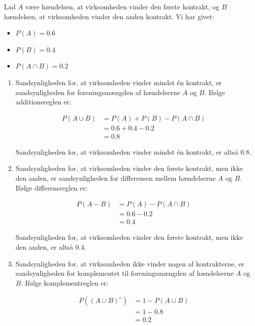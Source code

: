 \begin{solution}
    Lad $A$ være hændelsen, at virksomheden vinder den første kontrakt, og $B$ hændelsen, at virksomheden vinder den anden kontrakt. Vi har givet:
    \begin{itemize}
        \item $P(A) = 0.6$
        \item $P(B) = 0.4$
        \item $P(A \cap B) = 0.2$
    \end{itemize}
    
    \begin{enumerate}[label=(\alph*)]
        \item Sandsynligheden for, at virksomheden vinder mindst én kontrakt, er sandsynligheden for foreningsmængden af hændelserne $A$ og $B$. Ifølge additionsreglen er:
        
        \begin{align*}
            P(A \cup B) &= P(A) + P(B) - P(A \cap B) \\
                        &= 0.6 + 0.4 - 0.2 \\
                        &= 0.8
        \end{align*}
        
        Sandsynligheden for, at virksomheden vinder mindst én kontrakt, er altså 0.8.
        
        \item Sandsynligheden for, at virksomheden vinder den første kontrakt, men ikke den anden, er sandsynligheden for differensen mellem hændelserne $A$ og $B$. Ifølge differensreglen er:
        
        \begin{align*}
            P(A - B) &= P(A) - P(A \cap B) \\
                    &= 0.6 - 0.2 \\
                    &= 0.4
        \end{align*}
        
        Sandsynligheden for, at virksomheden vinder den første kontrakt, men ikke den anden, er altså 0.4.
        
        \item Sandsynligheden for, at virksomheden ikke vinder nogen af kontrakterne, er sandsynligheden for komplementet til foreningsmængden af hændelserne $A$ og $B$. Ifølge komplementreglen er:
        
        \begin{align*}
            P((A \cup B)^c) &= 1 - P(A \cup B) \\
                                    &= 1 - 0.8 \\
                                    &= 0.2
        \end{align*}
        

\end{enumerate}
\end{solution}
